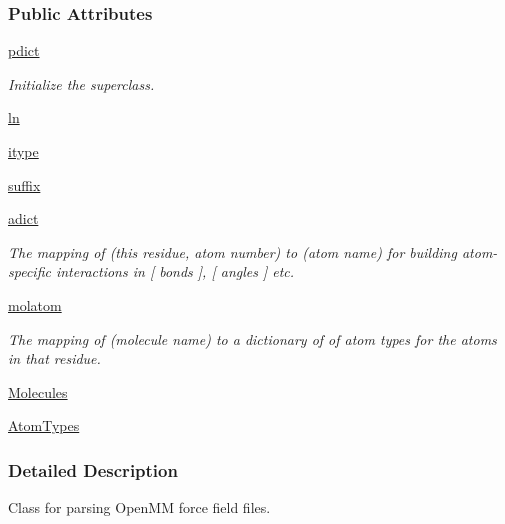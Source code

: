 \subsubsection*{\-Public \-Attributes}
\begin{DoxyCompactItemize}
\item 
\hyperlink{classforcebalance_1_1openmmio_1_1OpenMM__Reader_ae54c45bd673c1505c2760d4c8f741bd7}{pdict}
\begin{DoxyCompactList}\small\item\em \-Initialize the superclass. \end{DoxyCompactList}\item 
\hyperlink{classforcebalance_1_1BaseReader_a80c8e3bea212600742968aa8669e557b}{ln}
\item 
\hyperlink{classforcebalance_1_1BaseReader_a22ff3f4c684c728e019d801fface36f6}{itype}
\item 
\hyperlink{classforcebalance_1_1BaseReader_a48ef0584a1b6b4b6f8eb741ad8465db8}{suffix}
\item 
\hyperlink{classforcebalance_1_1BaseReader_a2c46ad6b66cf09a30e917ce4a1997e2a}{adict}
\begin{DoxyCompactList}\small\item\em \-The mapping of (this residue, atom number) to (atom name) for building atom-\/specific interactions in \mbox{[} bonds \mbox{]}, \mbox{[} angles \mbox{]} etc. \end{DoxyCompactList}\item 
\hyperlink{classforcebalance_1_1BaseReader_ab444c213e15929253dd73395ac5f19fc}{molatom}
\begin{DoxyCompactList}\small\item\em \-The mapping of (molecule name) to a dictionary of of atom types for the atoms in that residue. \end{DoxyCompactList}\item 
\hyperlink{classforcebalance_1_1BaseReader_a4369b5fb663a83b11602daa71db6862e}{\-Molecules}
\item 
\hyperlink{classforcebalance_1_1BaseReader_a69ca7d949a4a3df4d9f61e617fe0e270}{\-Atom\-Types}
\end{DoxyCompactItemize}


\subsubsection{\-Detailed \-Description}
\-Class for parsing \-Open\-M\-M force field files. 




